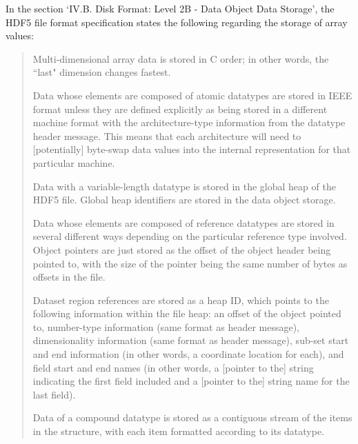 


In the section `IV.B. Disk Format: Level 2B - Data Object Data Storage', the HDF5 file format specification states the following regarding the storage of array values:

\begin{quote}
Multi-dimensional array data is stored in C order; in other words, the ``last" dimension changes fastest.

Data whose elements are composed of atomic datatypes are stored in IEEE format unless they are defined explicitly as being stored in a different machine format with the architecture-type information from the datatype header message. This means that each architecture will need to [potentially] byte-swap data values into the internal representation for that particular machine.

Data with a variable-length datatype is stored in the global heap of the HDF5 file. Global heap identifiers are stored in the data object storage.

Data whose elements are composed of reference datatypes are stored in several different ways depending on the particular reference type involved. Object pointers are just stored as the offset of the object header being pointed to, with the size of the pointer being the same number of bytes as offsets in the file.

Dataset region references are stored as a heap ID, which points to the following information within the file heap: an offset of the object pointed to, number-type information (same format as header message), dimensionality information (same format as header message), sub-set start and end information (in other words, a coordinate location for each), and field start and end names (in other words, a [pointer to the] string indicating the first field included and a [pointer to the] string name for the last field).

Data of a compound datatype is stored as a contiguous stream of the items in the structure, with each item formatted according to its datatype.
\end{quote}

